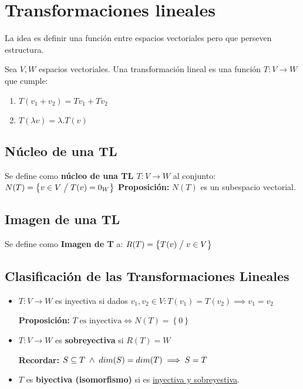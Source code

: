 \section*{Transformaciones lineales}
La idea es definir una función entre espacios vectoriales pero que perseven estructura.

Sea $ V, W $ espacios vectoriales. Una transformación lineal es una función $ T:V \to W $ que cumple:
\begin{enumerate}
    \item $ T(v_1 + v_2) = Tv_1 + Tv_2 $
    \item $ T(\lambda v) = \lambda . T(v) $
\end{enumerate}

\subsection*{Núcleo de una TL}
Se define como \textbf{núcleo de una TL $ T:V \to W $} al conjunto:
\begin{math}
    N(T) = \left\{ v \in V \; \big/ \; T(v) = 0_{W} \right\}
\end{math}
\textbf{Proposición:} $ N(T) $ es un subespacio vectorial.
\subsection*{Imagen de una TL}
Se define como \textbf{Imagen de T} a:
\begin{math}
    R(T) = \left\{ T(v) \; \big/ \; v \in V \right\}
\end{math}
\subsection{Clasificación de las Transformaciones Lineales}
\begin{itemize}
    \item $ T:V \to W $ es inyectiva si dados $ v_1,v_2 \in V : T(v_1) =T(v_2) \implies v_1 = v_2 $

    \textbf{Proposición:} $ T \; \text{es inyectiva} \iff N(T) = \left\{ 0 \right\}$ 
\item $ T: V \to W $ es \textbf{sobreyectiva} si $ R(T) = W $

    \textbf{Recordar:} $ S \subseteq T \; \wedge \; dim(S) = dim(T) \implies S = T $

\item $ T $ es \textbf{biyectiva (isomorfismo)} si es \underline{inyectiva y sobreyestiva}.

\end{itemize}

